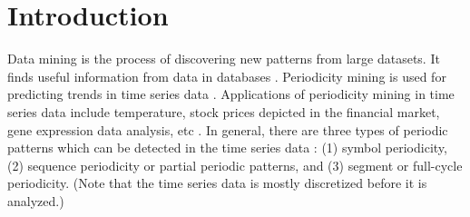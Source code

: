 %
%
%
\chapter{Introduction}
\vspace*{30pt} Data mining is the process of discovering new
patterns from large datasets. It finds useful information from data
in databases \cite{Iosif2015}. Periodicity mining is used for
predicting trends in time series data \cite{Pablo2006, Pippa2016,
Mohammadi2015}. Applications of periodicity mining in time series
data include temperature, stock prices depicted in the financial
market, gene expression data analysis, etc \cite{Parvez2014,
Abd2010}. In general, there are three types of periodic patterns
which can be detected in the time series data \cite{Iosif2015}: (1)
symbol periodicity, (2) sequence periodicity or partial periodic
patterns, and (3) segment or full-cycle periodicity. (Note that the
time series data is mostly discretized before it is analyzed.)
